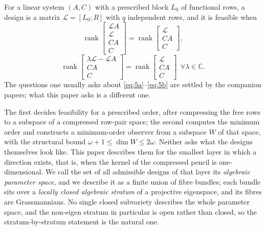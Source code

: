 \documentclass[journal]{IEEEtran}
\theoremstyle{plainn}
\theoremstyle{remark}
\newcommand{\rank}{\operatorname{rank}}
\begin{document}
For a linear system $(A,C)$ with a prescribed block $L_0$ of functional rows, a design is a matrix
$\mathcal L=[L_0;R]$ with $q$ independent rows, and it is feasible when
\begin{equation}\label{eq:5a}
\rank\begin{bmatrix}\mathcal LA\\ \mathcal L\\ CA\\ C\end{bmatrix}
=\rank\begin{bmatrix}\mathcal L\\ CA\\ C\end{bmatrix},
\end{equation}
\begin{equation}\label{eq:5b}
\rank\begin{bmatrix}\lambda\mathcal L-\mathcal LA\\ CA\\ C\end{bmatrix}
=\rank\begin{bmatrix}\mathcal L\\ CA\\ C\end{bmatrix}\ \ \forall\lambda\in\mathbb C .
\end{equation}
The questions one usually asks about \eqref{eq:5a}--\eqref{eq:5b} are settled by the companion
papers; what this paper asks is a different one.

The first \cite{companion1} decides feasibility for a prescribed order, after compressing the free
rows to a subspace of a compressed row-pair space; the second \cite{companion2} computes the minimum
order and constructs a minimum-order observer from a subspace $W$ of that space, with the structural
bound $\omega+1\le\dim W\le 2\omega$. Neither asks what the designs themselves look like. This paper
describes them for the smallest layer in which a direction exists, that is, when the kernel of the
compressed pencil is one-dimensional. We call the set of all admissible designs of that layer its
\emph{algebraic parameter space}, and we describe it as a finite union of fibre bundles; each bundle
sits over a \emph{locally closed algebraic stratum} of a projective eigenspace, and its fibres are
Grassmannians. No single closed subvariety describes the whole parameter space, and the non-eigen
stratum in particular is open rather than closed, so the stratum-by-stratum statement is the natural
one.
\end{document}
